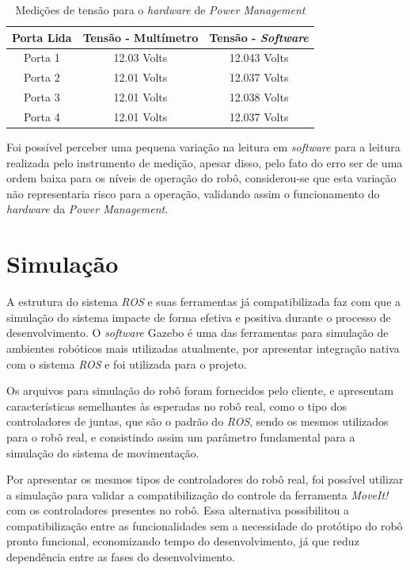 \begin{table}[H]
	\centering
	\caption{Medições de tensão para o \textit{hardware} de \textit{Power Management}}
	\label{tab:med_pow}
	\begin{tabular}{ccc}	
		\hline
		\multicolumn{1}{r}{Porta Lida}      & Tensão - Multímetro         & Tensão - \textit{Software}         \\ \hline
		Porta 1                                            & 12.03 Volts          & 12.043 Volts     \\ \hline
		Porta 2                                           & 12.01 Volts     & 12.037 Volts          \\ \hline
		Porta 3                                           & 12.01 Volts     & 12.038 Volts          \\ \hline
		Porta 4                                           & 12.01 Volts     & 12.037 Volts          \\ \hline
	\end{tabular}
\end{table}
Foi possível perceber uma pequena variação na leitura em \textit{software} para a leitura realizada pelo instrumento de medição, apesar disso, pelo fato do erro ser de uma ordem baixa para os níveis de operação do robô, considerou-se que esta variação não representaria risco para a operação, validando assim o funcionamento do \textit{hardware} da \textit{Power Management}.


\section{Simulação}\label{sec:simul_result}
A estrutura do sistema \textit{ROS} e suas ferramentas já compatibilizada faz com que a simulação do sistema impacte de forma efetiva e positiva durante o processo de desenvolvimento. O \textit{software} Gazebo é uma das ferramentas para simulação  de ambientes robóticos mais utilizadas atualmente, por apresentar integração nativa com o sistema \textit{ROS} e foi utilizada para o projeto.

Os arquivos para  simulação do robô foram fornecidos pelo cliente, e apresentam características semelhantes às esperadas no robô real, como o tipo dos controladores de juntas, que são o padrão do \textit{ROS}, sendo os mesmos utilizados para o robô real, e consistindo assim um parâmetro fundamental para a simulação do sistema de movimentação.

Por apresentar os mesmos tipos de controladores do robô real, foi possível utilizar a simulação para validar a compatibilização do controle da ferramenta \textit{MoveIt!} com os controladores presentes no robô. Essa alternativa possibilitou a compatibilização entre as funcionalidades sem a necessidade do protótipo do robô pronto funcional, economizando tempo do desenvolvimento, já que reduz dependência entre as fases do desenvolvimento.

